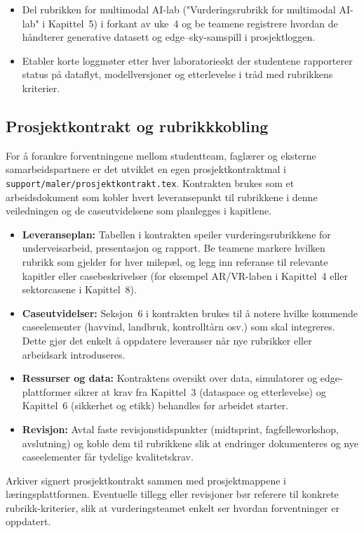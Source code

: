 \begin{itemize}
    \item Del rubrikken for multimodal AI-lab ("Vurderingsrubrikk for multimodal AI-lab" i Kapittel~5) i forkant av uke~4 og be teamene registrere hvordan de håndterer generative datasett og edge--sky-samspill i prosjektloggen.
    \item Etabler korte loggmøter etter hver laboratorieøkt der studentene rapporterer status på dataflyt, modellversjoner og etterlevelse i tråd med rubrikkens kriterier.
\end{itemize}

\subsection{Prosjektkontrakt og rubrikkkobling}
For å forankre forventningene mellom studentteam, faglærer og eksterne samarbeidspartnere er det utviklet en egen prosjektkontraktmal i \texttt{support/maler/prosjektkontrakt.tex}. Kontrakten brukes som et arbeidsdokument som kobler hvert leveransepunkt til rubrikkene i denne veiledningen og de caseutvidelsene som planlegges i kapitlene.
\begin{itemize}
    \item \textbf{Leveranseplan:} Tabellen i kontrakten speiler vurderingsrubrikkene for underveisarbeid, presentasjon og rapport. Be teamene markere hvilken rubrikk som gjelder for hver milepæl, og legg inn referanse til relevante kapitler eller casebeskrivelser (for eksempel AR/VR-laben i Kapittel~4 eller sektorcasene i Kapittel~8).
    \item \textbf{Caseutvidelser:} Seksjon~6 i kontrakten brukes til å notere hvilke kommende caseelementer (havvind, landbruk, kontrolltårn osv.) som skal integreres. Dette gjør det enkelt å oppdatere leveranser når nye rubrikker eller arbeidsark introduseres.
    \item \textbf{Ressurser og data:} Kontraktens oversikt over data, simulatorer og edge-plattformer sikrer at krav fra Kapittel~3 (dataspace og etterlevelse) og Kapittel~6 (sikkerhet og etikk) behandles før arbeidet starter.
    \item \textbf{Revisjon:} Avtal faste revisjonstidspunkter (midtsprint, fagfelleworkshop, avslutning) og koble dem til rubrikkene slik at endringer dokumenteres og nye caseelementer får tydelige kvalitetskrav.
\end{itemize}
Arkiver signert prosjektkontrakt sammen med prosjektmappene i læringsplattformen. Eventuelle tillegg eller revisjoner bør referere til konkrete rubrikk-kriterier, slik at vurderingsteamet enkelt ser hvordan forventninger er oppdatert.

